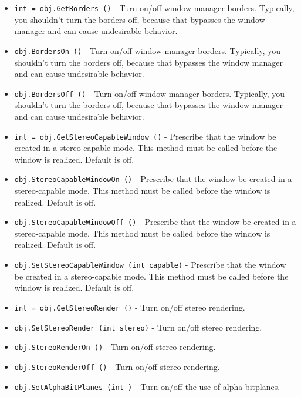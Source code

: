 \begin{itemize}
\item  \verb|int = obj.GetBorders ()| -  Turn on/off window manager borders. Typically, you shouldn't turn the
 borders off, because that bypasses the window manager and can cause
 undesirable behavior.

\item  \verb|obj.BordersOn ()| -  Turn on/off window manager borders. Typically, you shouldn't turn the
 borders off, because that bypasses the window manager and can cause
 undesirable behavior.

\item  \verb|obj.BordersOff ()| -  Turn on/off window manager borders. Typically, you shouldn't turn the
 borders off, because that bypasses the window manager and can cause
 undesirable behavior.

\item  \verb|int = obj.GetStereoCapableWindow ()| -  Prescribe that the window be created in a stereo-capable mode. This
 method must be called before the window is realized. Default is off.

\item  \verb|obj.StereoCapableWindowOn ()| -  Prescribe that the window be created in a stereo-capable mode. This
 method must be called before the window is realized. Default is off.

\item  \verb|obj.StereoCapableWindowOff ()| -  Prescribe that the window be created in a stereo-capable mode. This
 method must be called before the window is realized. Default is off.

\item  \verb|obj.SetStereoCapableWindow (int capable)| -  Prescribe that the window be created in a stereo-capable mode. This
 method must be called before the window is realized. Default is off.

\item  \verb|int = obj.GetStereoRender ()| -  Turn on/off stereo rendering.

\item  \verb|obj.SetStereoRender (int stereo)| -  Turn on/off stereo rendering.

\item  \verb|obj.StereoRenderOn ()| -  Turn on/off stereo rendering.

\item  \verb|obj.StereoRenderOff ()| -  Turn on/off stereo rendering.

\item  \verb|obj.SetAlphaBitPlanes (int )| -  Turn on/off the use of alpha bitplanes.


\end{itemize}

